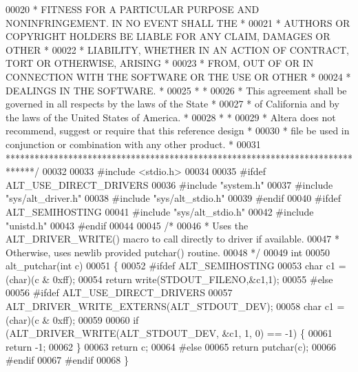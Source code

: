 \begin{DoxyCode}
00020 \textcolor{comment}{* FITNESS FOR A PARTICULAR PURPOSE AND NONINFRINGEMENT. IN NO EVENT SHALL THE *}
00021 \textcolor{comment}{* AUTHORS OR COPYRIGHT HOLDERS BE LIABLE FOR ANY CLAIM, DAMAGES OR OTHER      *}
00022 \textcolor{comment}{* LIABILITY, WHETHER IN AN ACTION OF CONTRACT, TORT OR OTHERWISE, ARISING     *}
00023 \textcolor{comment}{* FROM, OUT OF OR IN CONNECTION WITH THE SOFTWARE OR THE USE OR OTHER         *}
00024 \textcolor{comment}{* DEALINGS IN THE SOFTWARE.                                                   *}
00025 \textcolor{comment}{*                                                                             *}
00026 \textcolor{comment}{* This agreement shall be governed in all respects by the laws of the State   *}
00027 \textcolor{comment}{* of California and by the laws of the United States of America.              *}
00028 \textcolor{comment}{*                                                                             *}
00029 \textcolor{comment}{* Altera does not recommend, suggest or require that this reference design    *}
00030 \textcolor{comment}{* file be used in conjunction or combination with any other product.          *}
00031 \textcolor{comment}{******************************************************************************/}
00032 
00033 \textcolor{preprocessor}{#include <stdio.h>}
00034 
00035 \textcolor{preprocessor}{#ifdef ALT\_USE\_DIRECT\_DRIVERS}
00036 \textcolor{preprocessor}{#include "system.h"}
00037 \textcolor{preprocessor}{#include "sys/alt_driver.h"}
00038 \textcolor{preprocessor}{#include "sys/alt_stdio.h"}
00039 \textcolor{preprocessor}{#endif}
00040 \textcolor{preprocessor}{#ifdef ALT\_SEMIHOSTING}
00041 \textcolor{preprocessor}{#include "sys/alt_stdio.h"}
00042 \textcolor{preprocessor}{#include "unistd.h"}
00043 \textcolor{preprocessor}{#endif}
00044 
00045 \textcolor{comment}{/*}
00046 \textcolor{comment}{ * Uses the ALT\_DRIVER\_WRITE() macro to call directly to driver if available.}
00047 \textcolor{comment}{ * Otherwise, uses newlib provided putchar() routine.}
00048 \textcolor{comment}{ */}
00049 \textcolor{keywordtype}{int} 
00050 alt_putchar(\textcolor{keywordtype}{int} c)
00051 \{
00052 \textcolor{preprocessor}{#ifdef ALT\_SEMIHOSTING}
00053     \textcolor{keywordtype}{char}        c1 = (char)(c & 0xff);
00054     \textcolor{keywordflow}{return} write(STDOUT\_FILENO,&c1,1);
00055 \textcolor{preprocessor}{#else}
00056 \textcolor{preprocessor}{#ifdef ALT\_USE\_DIRECT\_DRIVERS}
00057     ALT_DRIVER_WRITE_EXTERNS(ALT_STDOUT_DEV);
00058     \textcolor{keywordtype}{char}        c1 = (char)(c & 0xff);
00059 
00060     \textcolor{keywordflow}{if} (ALT_DRIVER_WRITE(ALT_STDOUT_DEV, &c1, 1, 0) == -1) \{
00061         \textcolor{keywordflow}{return} -1;
00062     \}
00063     \textcolor{keywordflow}{return} c;
00064 \textcolor{preprocessor}{#else}
00065     \textcolor{keywordflow}{return} putchar(c);
00066 \textcolor{preprocessor}{#endif}
00067 \textcolor{preprocessor}{#endif}
00068 \}
\end{DoxyCode}
